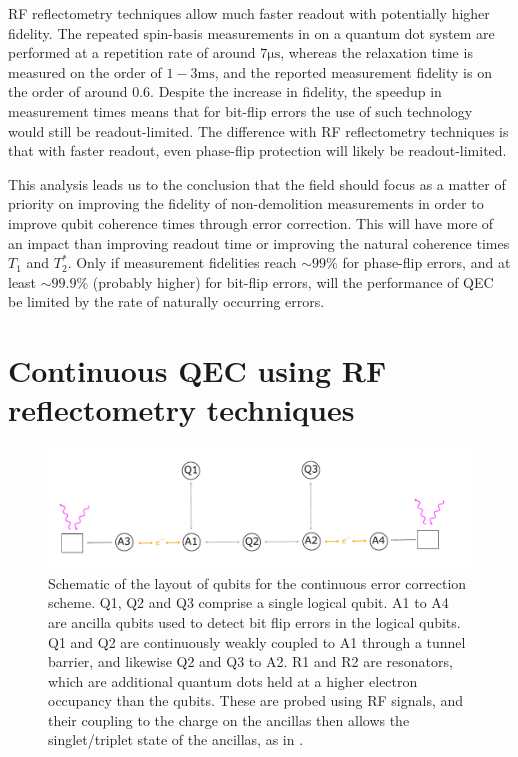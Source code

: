 \documentclass{report}
\begin{document}
RF reflectometry techniques allow much faster readout with potentially higher fidelity. The repeated spin-basis measurements in \cite{Nakajima2019} on a quantum dot system are performed at a repetition rate of around $7\unit{\micro\second}$, whereas the relaxation time is measured on the order of $1-3\unit{\milli\second}$, and the reported measurement fidelity is on the order of around $0.6$.  Despite the increase in fidelity, the speedup in measurement times means that for bit-flip errors the use of such technology would still be readout-limited. The difference with RF reflectometry techniques is that with faster readout, even phase-flip protection will likely be readout-limited. 

This analysis leads us to the conclusion that the field should focus as a matter of priority on improving the fidelity of non-demolition measurements in order to improve qubit coherence times through error correction. This will have more of an impact than improving readout time or improving the natural coherence times $T_1$ and $T_2^*$. Only if measurement fidelities reach $\sim 99\%$ for phase-flip errors, and at least $\sim99.9\%$ (probably higher) for bit-flip errors, will the performance of QEC be limited by the rate of naturally occurring errors.

\chapter{Continuous QEC using RF reflectometry techniques} \label{chapter:CQEC}
\begin{figure}[ht]
    \centering
    \includegraphics[scale = 0.9]{Figures/7q.pdf}
    \caption{Schematic of the layout of qubits for the continuous error correction scheme. Q1, Q2 and Q3 comprise a single logical qubit. A1 to A4 are ancilla qubits used to detect bit flip errors in the logical qubits. Q1 and Q2 are continuously weakly coupled to A1 through a tunnel barrier, and likewise Q2 and Q3 to A2. R1 and R2 are resonators, which are additional quantum dots held at a higher electron occupancy than the qubits. These are probed using RF signals, and their coupling to the charge on the ancillas then allows the singlet/triplet state of the ancillas, as in \cite{Oakes2022}.}
    \label{fig:7qubitlayout}
\end{figure}
\end{document}

